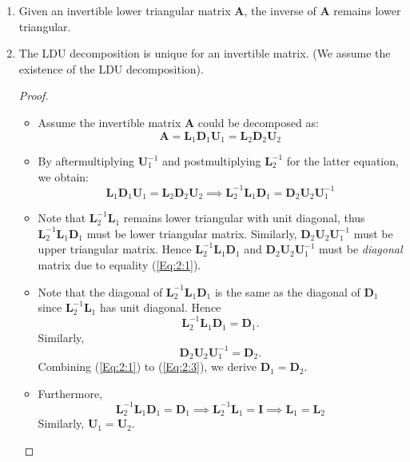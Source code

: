 \begin{enumerate}
\item
Given an invertible lower triangular matrix $\bm A$, the inverse of $\bm A$ remains lower triangular.
\item
The LDU decomposition is unique for an invertible matrix. (We assume the existence of the LDU decomposition).
\begin{proof}
\begin{itemize}
\item
Assume the invertible matrix $\bm A$ could be decomposed as:
\[
\bm A = \bm L_{1}\bm D_{1}\bm U_{1} = \bm L_{2}\bm D_{2}\bm U_{2}
\]
\item
By aftermultiplying $\bm U_{1}^{-1}$ and postmultiplying $\bm L_{2}^{-1}$ for the latter equation, we obtain:
\begin{equation}
\bm L_{1}\bm D_{1}\bm U_{1} = \bm L_{2}\bm D_{2}\bm U_{2}
\implies 
\bm L_{2}^{-1}\bm L_{1}\bm D_{1} = \bm D_{2}\bm U_{2}\bm U_{1}^{-1}\label{Eq:2:1}
\end{equation}
\item
Note that $\bm L_{2}^{-1}\bm L_{1}$ remains lower triangular with unit diagonal, thus $\bm L_{2}^{-1}\bm L_{1}\bm D_{1}$ must be lower triangular matrix. Similarly, $\bm D_{2}\bm U_{2}\bm U_{1}^{-1}$ must be upper triangular matrix. Hence $\bm L_{2}^{-1}\bm L_{1}\bm D_{1}$ and $\bm D_{2}\bm U_{2}\bm U_{1}^{-1}$ must be \textit{diagonal} matrix due to equality (\ref{Eq:2:1}).
\item
Note that the diagonal of $\bm L_{2}^{-1}\bm L_{1}\bm D_{1}$ is the same as the diagonal of $\bm D_{1}$ since $\bm L_{2}^{-1}\bm L_{1}$ has unit diagonal. Hence 
\begin{equation}
\bm L_{2}^{-1}\bm L_{1}\bm D_{1} = \bm D_1.\label{Eq:2:2}
\end{equation}
Similarly, 
\begin{equation}
\bm D_{2}\bm U_{2}\bm U_{1}^{-1} = \bm D_{2}.\label{Eq:2:3}
\end{equation}
Combining (\ref{Eq:2:1}) to (\ref{Eq:2:3}), we derive $\bm D_{1} = \bm D_{2}$.
\item
Furthermore, 
\[
\bm L_{2}^{-1}\bm L_{1}\bm D_{1} = \bm D_{1}\implies
\bm L_{2}^{-1}\bm L_{1}=\bm I\implies\bm L_1 = \bm L_2
\]
Similarly, $\bm U_{1} = \bm U_{2}$.
\end{itemize}
\end{proof}
\end{enumerate}
